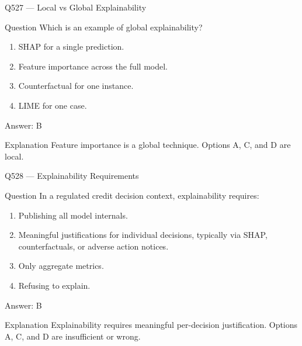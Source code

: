\documentclass[aspectratio=169,8pt]{beamer}
\begin{document}
	\begin{frame}{Q527 --- Local vs Global Explainability}
		\begin{block}{Question}
			Which is an example of global explainability?
			\begin{enumerate}
				\item SHAP for a single prediction.
				\item Feature importance across the full model.
				\item Counterfactual for one instance.
				\item LIME for one case.
			\end{enumerate}
		\end{block}
		\begin{exampleblock}{Answer: B}\end{exampleblock}
		\begin{block}{Explanation}
			Feature importance is a global technique. Options A, C, and D are local.
		\end{block}
	\end{frame}
	
	\begin{frame}{Q528 --- Explainability Requirements}
		\begin{block}{Question}
			In a regulated credit decision context, explainability requires:
			\begin{enumerate}
				\item Publishing all model internals.
				\item Meaningful justifications for individual decisions, typically via SHAP, counterfactuals, or adverse action notices.
				\item Only aggregate metrics.
				\item Refusing to explain.
			\end{enumerate}
		\end{block}
		\begin{exampleblock}{Answer: B}\end{exampleblock}
		\begin{block}{Explanation}
			Explainability requires meaningful per-decision justification. Options A, C, and D are insufficient or wrong.
		\end{block}
	\end{frame}
	
\end{document}
